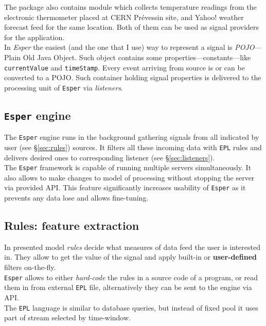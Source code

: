 \documentclass[11pt, letterpaper]{article}            %
\begin{document}
The package also contains module which collects temperature readings from the electronic thermometer placed at CERN Prévessin site, and Yahoo! weather forecast feed for the same location. Both of them can be used as signal providers for the application.\\

In \emph{Esper} the easiest (and the one that I use) way to represent a signal is \emph{POJO}---Plain Old Java Object. Such object contains some properties---constants---like \texttt{currentValue} and \texttt{timeStamp}. Every event arriving from source is or can be converted to a POJO. Such container holding signal properties is delivered to the processing unit of \texttt{Esper} via \emph{listeners}.

\subsection{\texttt{Esper} engine}
The \texttt{Esper} engine runs in the background gathering signals from all indicated by user (see §\ref{sec:rules}) sources. It filters all these incoming data with \texttt{EPL} rules and delivers desired ones to corresponding listener (see §\ref{sec:listeners}).\\
The \texttt{Esper} framework is capable of running multiple servers simultaneously. It also allows to make changes to model of processing without stopping the server via provided API. This feature significantly increases usability of \texttt{Esper} as it prevents any data lose and allows fine-tuning.\\

\subsection{Rules: feature extraction\label{sec:rules}}
In presented model \emph{rules} decide what measures of data feed the user is interested in. They allow to get the value of the signal and apply built-in or \textbf{user-defined} filters on-the-fly.\\
\texttt{Esper} allows to either \emph{hard-code} the rules in a source code of a program, or read them in from external \texttt{EPL} file, alternatively they can be sent to the engine via API.\\
The \texttt{EPL} language is similar to database queries, but instead of fixed pool it uses part of stream selected by time-window.\\
\end{document}
